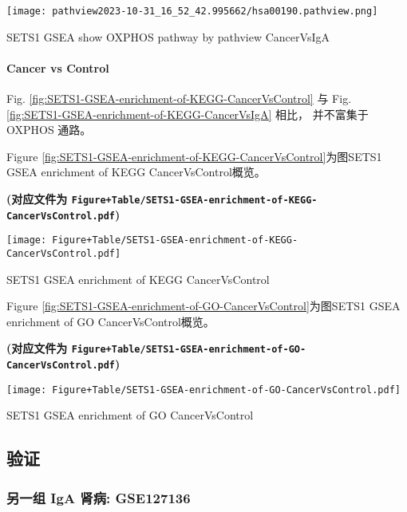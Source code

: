 \documentclass[
]{article}
\begin{document}
\def\@captype{figure}
\begin{center}
\texttt{[image: pathview2023-10-31\_16\_52\_42.995662/hsa00190.pathview.png]}
\caption{SETS1 GSEA show OXPHOS pathway by pathview CancerVsIgA}\label{fig:SETS1-GSEA-show-OXPHOS-pathway-by-pathview-CancerVsIgA}
\end{center}

\hypertarget{cancer-vs-control}{%
\paragraph{Cancer vs Control}\label{cancer-vs-control}}

Fig. \ref{fig:SETS1-GSEA-enrichment-of-KEGG-CancerVsControl} 与 Fig. \ref{fig:SETS1-GSEA-enrichment-of-KEGG-CancerVsIgA} 相比，
并不富集于 OXPHOS 通路。

Figure \ref{fig:SETS1-GSEA-enrichment-of-KEGG-CancerVsControl}为图SETS1 GSEA enrichment of KEGG CancerVsControl概览。

\textbf{(对应文件为 \texttt{Figure+Table/SETS1-GSEA-enrichment-of-KEGG-CancerVsControl.pdf})}

\def\@captype{figure}
\begin{center}
\texttt{[image: Figure+Table/SETS1-GSEA-enrichment-of-KEGG-CancerVsControl.pdf]}
\caption{SETS1 GSEA enrichment of KEGG CancerVsControl}\label{fig:SETS1-GSEA-enrichment-of-KEGG-CancerVsControl}
\end{center}

Figure \ref{fig:SETS1-GSEA-enrichment-of-GO-CancerVsControl}为图SETS1 GSEA enrichment of GO CancerVsControl概览。

\textbf{(对应文件为 \texttt{Figure+Table/SETS1-GSEA-enrichment-of-GO-CancerVsControl.pdf})}

\def\@captype{figure}
\begin{center}
\texttt{[image: Figure+Table/SETS1-GSEA-enrichment-of-GO-CancerVsControl.pdf]}
\caption{SETS1 GSEA enrichment of GO CancerVsControl}\label{fig:SETS1-GSEA-enrichment-of-GO-CancerVsControl}
\end{center}

\hypertarget{ux9a8cux8bc1}{%
\subsection{验证}\label{ux9a8cux8bc1}}

\hypertarget{ux53e6ux4e00ux7ec4-iga-ux80beux75c5-gse127136}{%
\subsubsection{另一组 IgA 肾病: GSE127136}\label{ux53e6ux4e00ux7ec4-iga-ux80beux75c5-gse127136}}
\end{document}
